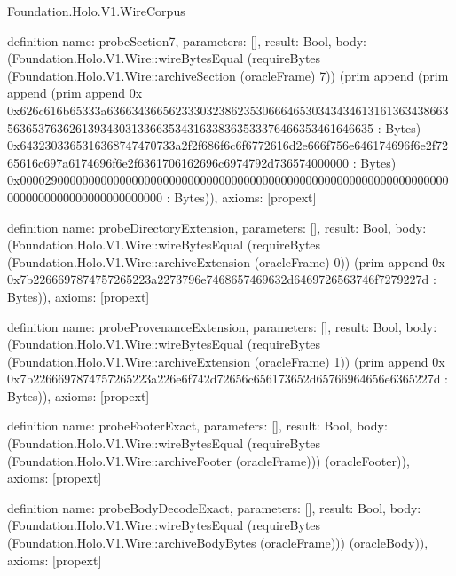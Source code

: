 \begin{lexlean}{Foundation.Holo.V1.WireCorpus}
\begin{semanticmodule}
definition{
  name: probeSection7,
  parameters: [],
  result: Bool,
  body: (Foundation.Holo.V1.Wire::wireBytesEqual (requireBytes (Foundation.Holo.V1.Wire::archiveSection (oracleFrame) 7)) (prim append (prim append (prim append 0x 0x626c616b65333a636634366562333032386235306664653034343461316136343866356365376362613934303133663534316338363533376466353461646635 : Bytes) 0x6432303365316368747470733a2f2f686f6c6f6772616d2e666f756e646174696f6e2f7265616c697a6174696f6e2f6361706162696c6974792d736574000000 : Bytes) 0x0000290000000000000000000000000000000000000000000000000000000000000000000000000000000000000000 : Bytes)),
  axioms: [propext]
}

definition{
  name: probeDirectoryExtension,
  parameters: [],
  result: Bool,
  body: (Foundation.Holo.V1.Wire::wireBytesEqual (requireBytes (Foundation.Holo.V1.Wire::archiveExtension (oracleFrame) 0)) (prim append 0x 0x7b2266697874757265223a2273796e7468657469632d6469726563746f7279227d : Bytes)),
  axioms: [propext]
}

definition{
  name: probeProvenanceExtension,
  parameters: [],
  result: Bool,
  body: (Foundation.Holo.V1.Wire::wireBytesEqual (requireBytes (Foundation.Holo.V1.Wire::archiveExtension (oracleFrame) 1)) (prim append 0x 0x7b2266697874757265223a226e6f742d72656c656173652d65766964656e6365227d : Bytes)),
  axioms: [propext]
}

definition{
  name: probeFooterExact,
  parameters: [],
  result: Bool,
  body: (Foundation.Holo.V1.Wire::wireBytesEqual (requireBytes (Foundation.Holo.V1.Wire::archiveFooter (oracleFrame))) (oracleFooter)),
  axioms: [propext]
}

definition{
  name: probeBodyDecodeExact,
  parameters: [],
  result: Bool,
  body: (Foundation.Holo.V1.Wire::wireBytesEqual (requireBytes (Foundation.Holo.V1.Wire::archiveBodyBytes (oracleFrame))) (oracleBody)),
  axioms: [propext]
}


\end{semanticmodule}
\end{lexlean}

